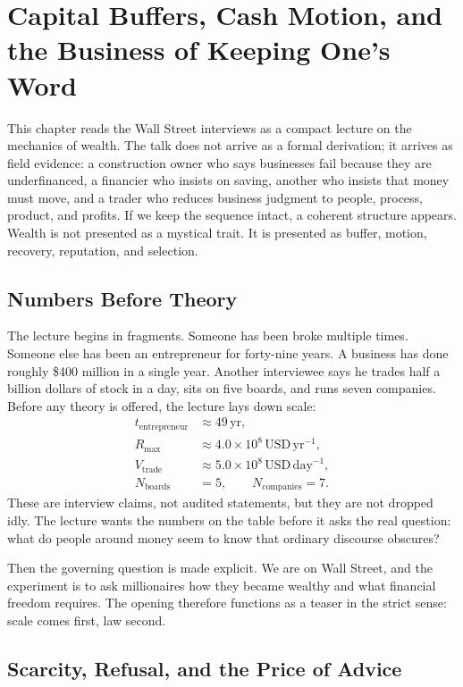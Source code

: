 \chapter{Capital Buffers, Cash Motion, and the Business of Keeping One's Word}

This chapter reads the Wall Street interviews as a compact lecture on the mechanics of wealth. The talk does not arrive as a formal derivation; it arrives as field evidence: a construction owner who says businesses fail because they are underfinanced, a financier who insists on saving, another who insists that money must move, and a trader who reduces business judgment to people, process, product, and profits. If we keep the sequence intact, a coherent structure appears. Wealth is not presented as a mystical trait. It is presented as buffer, motion, recovery, reputation, and selection.

\section{Numbers Before Theory}

The lecture begins in fragments. Someone has been broke multiple times. Someone else has been an entrepreneur for forty-nine years. A business has done roughly \$400 million in a single year. Another interviewee says he trades half a billion dollars of stock in a day, sits on five boards, and runs seven companies. Before any theory is offered, the lecture lays down scale:
\begin{align}
t_{\text{entrepreneur}} &\approx 49\,\text{yr},\\
R_{\max} &\approx 4.0\times 10^8\,\text{USD}\,\text{yr}^{-1},\\
V_{\text{trade}} &\approx 5.0\times 10^8\,\text{USD}\,\text{day}^{-1},\\
N_{\text{boards}} &= 5,\qquad N_{\text{companies}} = 7.
\end{align}
These are interview claims, not audited statements, but they are not dropped idly. The lecture wants the numbers on the table before it asks the real question: what do people around money seem to know that ordinary discourse obscures?

Then the governing question is made explicit. We are on Wall Street, and the experiment is to ask millionaires how they became wealthy and what financial freedom requires. The opening therefore functions as a teaser in the strict sense: scale comes first, law second.

\section{Scarcity, Refusal, and the Price of Advice}

